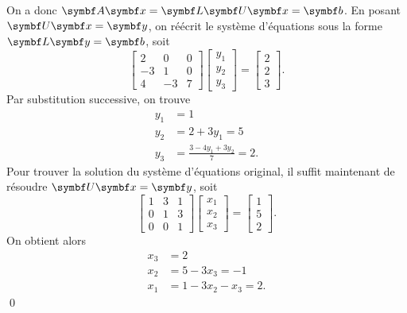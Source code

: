 \begin{exemple}
  On a donc $\mat{A} \mat{x} = \mat{L} \mat{U} \mat{x} =
  \mat{b}$. En posant $\mat{U} \mat{x} = \mat{y}$, on réécrit le
  système d'équations sous la forme $\mat{L} \mat{y} = \mat{b}$, soit
  \begin{displaymath}
    \begin{bmatrix}
       2 &  0 & 0 \\
      -3 &  1 & 0 \\
       4 & -3 & 7
    \end{bmatrix}
    \begin{bmatrix}
      y_1 \\ y_2 \\ y_3
    \end{bmatrix}
    =
    \begin{bmatrix}
      2 \\ 2 \\ 3
    \end{bmatrix}.
  \end{displaymath}
  Par substitution successive, on trouve
  \begin{align*}
    y_1 &= 1 \\
    y_2 &= 2 + 3 y_1 = 5 \\
    y_3 &= \frac{3 - 4 y_1 + 3 y_2}{7} = 2.
  \end{align*}
  Pour trouver la solution du système d'équations original, il suffit
  maintenant de résoudre $\mat{U} \mat{x} = \mat{y}$, soit
  \begin{displaymath}
    \begin{bmatrix}
      1 & 3 & 1 \\
      0 & 1 & 3 \\
      0 & 0 & 1
    \end{bmatrix}
    \begin{bmatrix}
      x_1 \\ x_2 \\ x_3
    \end{bmatrix}
    =
    \begin{bmatrix}
      1 \\ 5 \\ 2
    \end{bmatrix}.
  \end{displaymath}
  On obtient alors
  \begin{align*}
    x_3 &= 2 \\
    x_2 &= 5 - 3 x_3 = -1 \\
    x_1 &= 1 - 3 x_2 - x_3 = 2.
  \end{align*}
  \qed
\end{exemple}

